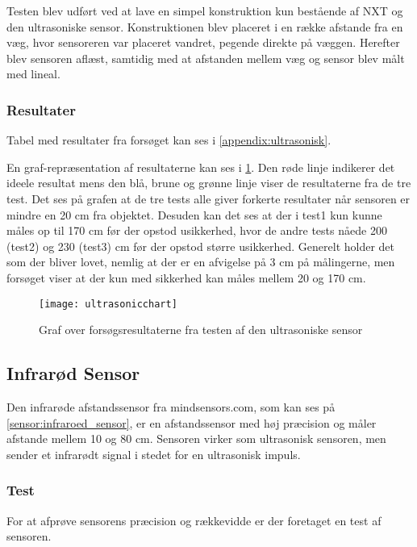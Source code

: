 Testen blev udført ved at lave en simpel konstruktion kun bestående af NXT og den ultrasoniske sensor.
Konstruktionen blev placeret i en række afstande fra en væg, hvor sensoreren var placeret vandret, pegende direkte på væggen.
Herefter blev sensoren aflæst, samtidig med at afstanden mellem væg og sensor blev målt med lineal.

\subsubsection{Resultater} Tabel med resultater fra forsøget kan ses i \cref{appendix:ultrasonisk}.

En graf-repræsentation af resultaterne kan ses i \cref{sensor:ultrasonic_resultat_diagram}.
Den røde linje indikerer det ideele resultat mens den blå, brune og grønne linje viser de resultaterne fra de tre test.
Det ses på grafen at de tre tests alle giver forkerte resultater når sensoren er mindre en 20 cm fra objektet.
Desuden kan det ses at der i test1 kun kunne måles op til 170 cm før der opstod usikkerhed, hvor de andre tests nåede 200 (test2) og 230 (test3) cm før der opstod større usikkerhed.
Generelt holder det som der bliver lovet, nemlig at der er en afvigelse på 3 cm på målingerne, men forsøget viser at der kun med sikkerhed kan måles mellem 20 og 170 cm.

\begin{figure}[h]
\centering
\texttt{[image: ultrasonicchart]}
\caption{Graf over forsøgsresultaterne fra testen af den ultrasoniske sensor}
\label{sensor:ultrasonic_resultat_diagram}
\end{figure}



\subsection{Infrarød Sensor}
Den infrarøde afstandssensor fra mindsensors.com, som kan ses på \cref{sensor:infraroed_sensor}, er en afstandssensor med høj præcision og måler afstande mellem 10 og 80 cm.
Sensoren virker som ultrasonisk sensoren, men sender et infrarødt signal i stedet for en ultrasonisk impuls.\cite{infrared}

\subsubsection{Test}
For at afprøve sensorens præcision og rækkevidde er der foretaget en test af sensoren.

